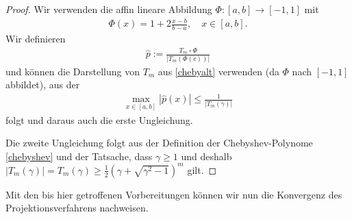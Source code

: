 \documentclass{article}
\theoremstyle{plain}
\begin{document}
\begin{proof}
	Wir verwenden die affin lineare Abbildung $\Phi: [a,b] \to [-1,1]$ mit
	\begin{align*}
		\Phi(x) = 1 + 2 \frac{x-b}{b-a}, \quad x \in [a,b].
	\end{align*}
	Wir definieren
	\begin{align*}
		\hat{p} := \frac{T_m \circ \Phi}{|T_m(\Phi(c))|}
	\end{align*}
	und können die Darstellung von $T_m$ aus \ref{chebyalt} verwenden (da $\Phi$ nach $[-1,1]$ abbildet), aus der
	\begin{align*}
		\max_{x \in [a,b]}|\hat{p}(x)| \leq \frac{1}{|T_m(\gamma)|}
	\end{align*}
	folgt und daraus auch die erste Ungleichung.

	Die zweite Ungleichung folgt aus der Definition der Chebyshev-Polynome \ref{chebyshev} und der Tatsache, dass $\gamma \geq 1$ und deshalb $|T_m(\gamma)| = T_m(\gamma) \geq \frac{1}{2} (\gamma+ \sqrt{\gamma^2-1})^m$ gilt.
\end{proof}

Mit den bis hier getroffenen Vorbereitungen können wir nun die Konvergenz des Projektionsverfahrens nachweisen.
\end{document}
